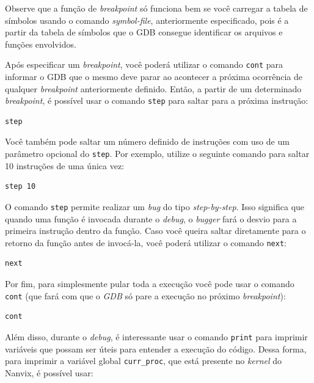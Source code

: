 \documentclass[11pt]{article}
\begin{document}
Observe que a função de \textit{breakpoint} só funciona bem se você carregar a tabela de símbolos usando o comando \textit{symbol-file}, anteriormente especificado, pois é a partir da tabela de símbolos que o GDB consegue identificar os arquivos e funções envolvidos.

Após especificar um \textit{breakpoint}, você poderá utilizar o comando \texttt{cont} para informar o GDB que o mesmo deve parar ao acontecer a próxima ocorrência de qualquer \textit{breakpoint} anteriormente definido. Então, a partir de um determinado \textit{breakpoint}, é possível usar o comando  \texttt{step} para saltar para a próxima instrução:\\

\begin{lstlisting}[language=sh,numbers=none,frame=single]
step
\end{lstlisting}

Você também pode saltar um número definido de instruções com uso de um parâmetro opcional do \texttt{step}. Por exemplo, utilize o seguinte comando para saltar 10 instruções de uma única vez:\\

\begin{lstlisting}[language=sh,numbers=none,frame=single]
step 10
\end{lstlisting}

O comando \texttt{step} permite realizar um \textit{bug} do tipo \textit{step-by-step}. Isso significa que quando uma função é invocada durante o \textit{debug}, o \textit{bugger} fará o desvio para a primeira instrução dentro da função. Caso você queira saltar diretamente para o retorno da função antes de invocá-la, você poderá utilizar o comando \texttt{next}:\\

\begin{lstlisting}[language=sh,numbers=none,frame=single]
next
\end{lstlisting}

Por fim, para simplesmente pular toda a execução você pode usar o comando \texttt{cont} (que fará com que o \textit{GDB} só pare a execução no próximo \textit{breakpoint}): \\

\begin{lstlisting}[language=sh,numbers=none,frame=single]
cont
\end{lstlisting}

Além disso, durante o \textit{debug}, é interessante usar o comando \texttt{print} para imprimir variáveis que possam ser úteis para entender a execução do código. Dessa forma, para imprimir a variável global \texttt{curr\_proc}, que está presente no \textit{kernel} do Nanvix, é possível usar:\\
\end{document}

